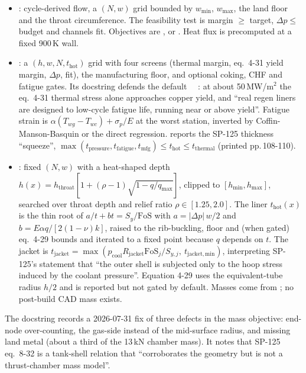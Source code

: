 \begin{itemize}
\item {}: cycle-derived flow, a $(N, w)$ grid bounded by $w_{\min}$, $w_{\max}$, the land floor and the throat circumference. The feasibility test is margin $\geq$ target, $\Delta p \leq$ budget and channels fit. Objectives are ,  or . Heat flux is precomputed at a fixed 900\,K wall.
\item {}: a $(h, w, N, t_{\mathrm{hot}})$ grid with four screens (thermal margin, eq.\ 4-31 yield margin, $\Delta p$, fit), the manufacturing floor, and optional coking, CHF and fatigue gates. Its docstring defends the default ~\code{=}~: at about 50\,MW/m$^2$ the eq.\ 4-31 thermal stress alone approaches copper yield, and ``real regen liners are designed to low-cycle fatigue life, running near or above yield''. Fatigue strain is $\alpha(T_{wg}-T_{wc}) + \sigma_p/E$ at the worst station, inverted by Coffin-Manson-Basquin or the direct regression.  reports the SP-125 thickness ``squeeze'', $\max(t_{\mathrm{pressure}}, t_{\mathrm{fatigue}}, t_{\mathrm{mfg}}) \leq t_{\mathrm{hot}} \leq t_{\mathrm{thermal}}$ (printed pp.\,108-110).
\item {}: fixed $(N, w)$ with a heat-shaped depth $h(x) = h_{\mathrm{throat}}[1 + (\rho-1)\sqrt{1 - q/q_{\max}}]$, clipped to $[h_{\min}, h_{\max}]$, searched over throat depth and relief ratio $\rho \in [1.25, 2.0]$. The liner $t_{\mathrm{hot}}(x)$ is the thin root of $a/t + bt = S_y/\mathrm{FoS}$ with $a = |\Delta p|\,w/2$ and $b = E\alpha q/[2(1-\nu)k]$, raised to the rib-buckling, floor and (when gated) eq.\ 4-29 bounds and iterated to a fixed point because $q$ depends on $t$. The jacket is $t_{\mathrm{jacket}} = \max(p_{\mathrm{cool}}R_{\mathrm{jacket}}\mathrm{FoS}_j/S_{y,j},\ t_{\mathrm{jacket,min}})$, interpreting SP-125's statement that ``the outer shell is subjected only to the hoop stress induced by the coolant pressure''. Equation 4-29 uses the equivalent-tube radius $h/2$ and is reported but not gated by default. Masses come from ; no post-build CAD mass exists.
\end{itemize}

The  docstring records a 2026-07-31 fix of three defects in the mass objective: end-node over-counting, the gas-side instead of the mid-surface radius, and missing land metal (about a third of the 13\,kN chamber mass). It notes that SP-125 eq.\ 8-32 is a tank-shell relation that ``corroborates the geometry but is not a thrust-chamber mass model''.

